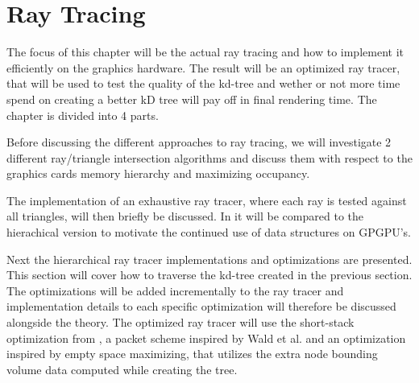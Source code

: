 


\chapter{Ray Tracing}\label{chp:rayTracing}





The focus of this chapter will be the actual ray tracing and how to
implement it efficiently on the graphics hardware. The result will be
an optimized ray tracer, that will be used to test the quality of the
kd-tree and wether or not more time spend on creating a better kD tree
will pay off in final rendering time. The chapter is divided into 4
parts.

Before discussing the different approaches to ray tracing, we will
investigate 2 different ray/triangle intersection algorithms and
discuss them with respect to the graphics cards memory hierarchy and
maximizing occupancy.

The implementation of an exhaustive ray tracer, where each ray is
tested against all triangles, will then briefly be discussed. In
 it will be compared to the hierachical
version to motivate the continued use of data structures on GPGPU's.

Next the hierarchical ray tracer implementations and optimizations are
presented. This section will cover how to traverse the kd-tree created
in the previous section. The optimizations will be added incrementally
to the ray tracer and implementation details to each specific
optimization will therefore be discussed alongside the theory. The
optimized ray tracer will use the short-stack optimization from \horn,
a packet scheme inspired by Wald et al. and
an optimization inspired by empty space maximizing, that utilizes the
extra node bounding volume data computed while creating the tree.

